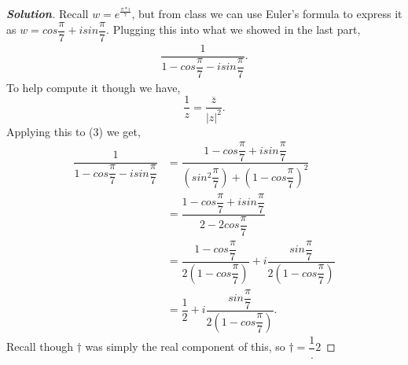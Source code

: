 \documentclass[11pt]{article}
\newenvironment{problem}[2][Problem\!]{\begin{trivlist}
\item[\hskip \labelsep {\bfseries #1}\hskip \labelsep {\bfseries #2}]}{\end{trivlist}}
\newenvironment{solution}{\begin{proof}[\textbf{\textit{Solution}}] }{\end{proof}}
\newcommand{\abs}[1]{\left\lvert#1\right\rvert} %
\newcommand{\lrp}[1]{\left(#1\right)}
\begin{document}
\begin{problem}{2.2}
\begin{itemize}[itemsep=3em]
\begin{itemize}[itemsep=2em]
\begin{example}
    \begin{solution}
        Recall $w = e^{\frac{\pi * i}{7}}$, but from class we can use Euler's formula to express it as $w = cos\dfrac{\pi}{7} + i sin\dfrac{\pi}{7}$. Plugging this into what we showed in the last part,
        \begin{align}
            \dfrac{1}{1 - cos\dfrac{\pi}{7} - i sin\dfrac{\pi}{7}}.
        \end{align}
        To help compute it though we have,
        \[\dfrac{1}{z} = \dfrac{\overline{z}}{\abs{z}^{2}}.\]
        Applying this to (3) we get,
        \begin{align*}
            \dfrac{1}{1 - cos\dfrac{\pi}{7} - i sin\dfrac{\pi}{7}} &= \dfrac{1 - cos \dfrac{\pi}{7} + i sin\dfrac{\pi}{7}}{\lrp{sin^{2}\dfrac{\pi}{7}} + \lrp{1 -cos\dfrac{\pi}{7}}^{2}}  \\
            &= \dfrac{1 - cos \dfrac{\pi}{7} + i sin\dfrac{\pi}{7}}{2 - 2cos\dfrac{\pi}{7}} \\
            &= \dfrac{1 - cos \dfrac{\pi}{7}}{2(1 - cos \dfrac{\pi}{7})} + i\dfrac{ sin\dfrac{\pi}{7}}{2(1 - cos \dfrac{\pi}{7})} \\
            &=\dfrac{1}{2} + i\dfrac{ sin\dfrac{\pi}{7}}{2(1 - cos \dfrac{\pi}{7})}.
        \end{align*}
        Recall though $\dagger$ was simply the real component of this, so $\dagger = \dfrac{1}.{2}$
        
        
    \end{solution}
\end{example}

\end{itemize}
\end{itemize}
\end{problem}

\newpage  %
\end{document}
